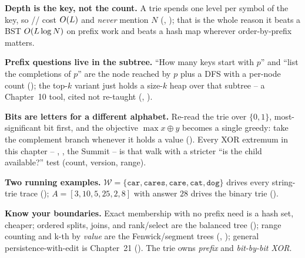\begin{quickref}
\textbf{Depth is the key, not the count.} A trie spends one level per symbol of the key, so
// cost $O(L)$ and \emph{never} mention $N$
(, ); that is the whole reason it beats a BST
$O(L\log N)$ on prefix work and beats a hash map wherever order-by-prefix matters.

\medskip
\textbf{Prefix questions live in the subtree.} ``How many keys start with $p$'' and ``list the completions
of $p$'' are the node reached by $p$ plus a DFS with a per-node count (); the top-$k$
variant just holds a size-$k$ heap over that subtree -- a Chapter~10 tool, cited not re-taught
(, ).

\medskip
\textbf{Bits are letters for a different alphabet.} Re-read the trie over $\{0,1\}$, most-significant bit
first, and the objective $\max x\oplus y$ becomes a single greedy: take the complement branch whenever it
holds a value (). Every XOR extremum in this chapter -- ,
, the Summit -- is that walk with a stricter ``is the child available?'' test
(count, version, range).

\medskip
\textbf{Two running examples.} $\mathcal{W}=\{\texttt{car},\texttt{cares},\texttt{care},\texttt{cat},
\texttt{dog}\}$ drives every string-trie trace (); $A=[3,10,5,25,2,8]$ with answer $28$
drives the binary trie ().

\medskip
\textbf{Know your boundaries.} Exact membership with no prefix need is a hash set, cheaper; ordered splits,
joins, and rank/select are the balanced tree (); range counting and k-th by \emph{value} are the
Fenwick/segment trees (, ); general persistence-with-edit is Chapter~21
(). The trie owns \emph{prefix} and \emph{bit-by-bit XOR}.
\end{quickref}

